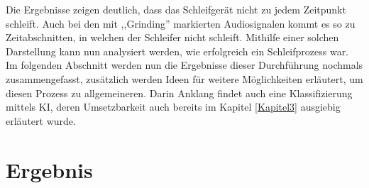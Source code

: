 Die Ergebnisse zeigen deutlich, dass das Schleifgerät nicht zu jedem Zeitpunkt schleift. Auch bei den mit ,,Grinding'' markierten Audiosignalen kommt es so zu Zeitabschnitten, in welchen der Schleifer nicht schleift. Mithilfe einer solchen Darstellung kann nun analysiert werden, wie erfolgreich ein Schleifprozess war. Im folgenden Abschnitt werden nun die Ergebnisse dieser Durchführung nochmals zusammengefasst, zusätzlich werden Ideen für weitere Möglichkeiten erläutert, um diesen Prozess zu allgemeineren. Darin Anklang findet auch eine Klassifizierung mittels \ac{KI}, deren Umsetzbarkeit auch bereits im Kapitel \ref{Kapitel3} ausgiebig erläutert wurde.


\section{Ergebnis}
